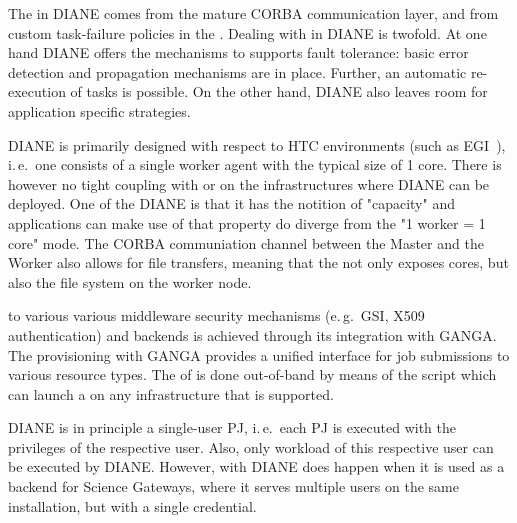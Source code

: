 \documentclass{sig-alternate}
\begin{document}
The  in DIANE comes from the mature CORBA communication
layer, and from custom task-failure policies in the .
Dealing with  in DIANE is twofold.
At one hand DIANE offers the mechanisms to supports fault tolerance: basic
error detection and propagation mechanisms are in place.
Further, an automatic re-execution of tasks is possible.
On the other hand, DIANE also leaves room for application specific strategies.

DIANE is primarily designed with respect to HTC environments (such as
EGI~\cite{egi}), i.\,e.\ one \pilot consists of a single worker agent with the
typical size of 1 core.
There is however no tight coupling with or  on
the infrastructures where DIANE can be deployed.
One of the DIANE  is that it has the notition of
"capacity" and applications can make use of that property do diverge from the
"1 worker = 1 core" mode.
The CORBA communiation channel between the Master and the Worker also allows
for file transfers, meaning that the \pilot not only exposes cores, but also
the file system on the worker node.

 to various various middleware security mechanisms
(e.\,g.\ GSI, X509 authentication) and backends is achieved through its
integration with GANGA.
The \pilot provisioning with GANGA provides a unified interface for job
submissions to various resource types.
The  of \pilots is done out-of-band by means of the
 script which can launch a \pilot on any infrastructure
that is supported.


DIANE is in principle a single-user PJ, i.\,e.\ each PJ is executed with the
privileges of the respective user.
Also, only workload of this respective user can be executed by DIANE.
However,  with DIANE does happen when it is used as a
backend for Science Gateways, where it serves multiple users on the same
installation, but with a single credential.

\end{document}
